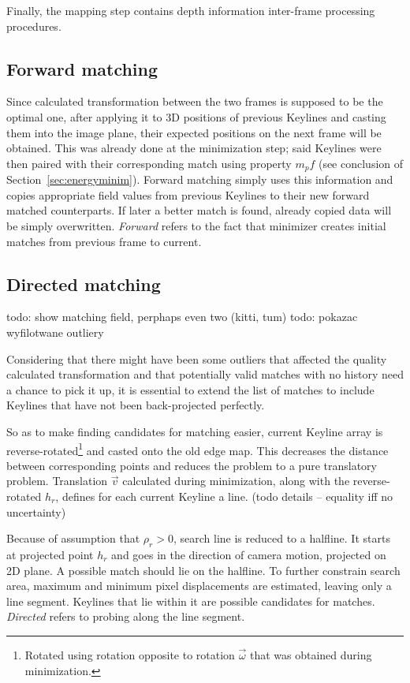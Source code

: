 Finally, the mapping step contains depth information inter-frame processing procedures.

\subsection{Forward matching}


Since calculated transformation between the two frames is supposed to be the optimal one, after applying it to 3D positions of previous Keylines and casting them into the image plane, their expected positions on the next frame will be obtained. This was already done at the minimization step; said Keylines were then paired with their corresponding match using property $m_pf$ (see conclusion of Section~\ref{sec:energyminim}). Forward matching simply uses this information and copies appropriate field values from previous Keylines to their new forward matched counterparts. If later a better match is found, already copied data will be simply overwritten. \textit{Forward} refers to the fact that minimizer creates initial matches from previous frame to current.

\subsection{Directed matching}

todo: show matching field, perphaps even two (kitti, tum)
todo: pokazac wyfilotwane outliery

Considering that there might have been some outliers that affected the quality calculated transformation and that potentially valid matches with no history need a chance to pick it up, it is essential to extend the list of matches to include Keylines that have not been back-projected perfectly.

So as to make finding candidates for matching easier, current Keyline array is reverse-rotated\footnote{Rotated using rotation opposite to rotation $\vec{\omega}$ that was obtained during minimization.} and casted onto the old edge map. This decreases the distance between corresponding points and reduces the problem to a pure translatory problem. Translation $\vec{v}$ calculated during minimization, along with the reverse-rotated $h_r$, defines for each current Keyline a line. (todo details -- equality iff no uncertainty)

Because of assumption that $\rho_r > 0$, search line is reduced to a halfline. It starts at projected point $h_r$ and goes in the direction of camera motion, projected on 2D plane. A possible match should lie on the halfline. To further constrain search area, maximum and minimum pixel displacements are estimated, leaving only a line segment. Keylines that lie within it are possible candidates for matches.  \textit{Directed} refers to probing along the line segment.

